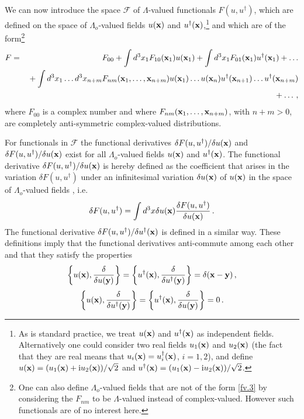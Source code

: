 \documentclass[12pt]{article}
\def\ii{\textrm i}
\begin{document}
We can now introduce the space ${\mathcal{F}}$ of $\Lambda$-valued functionals $F(u,u^\dagger)$, which are defined on the space of $\Lambda_o$-valued fields $u({\bf x})$ and $u^\dagger({\bf x})$,{\footnote{As is standard practice, we treat $u({\bf x})$ and $u^\dagger({\bf x})$ as independent fields. Alternatively one could consider two real fields $u_1({\bf x})$ and $u_2({\bf x})$ (the fact that they are real means that $u_i({\bf x})=u^\dagger_i({\bf x})$, $i=1,2$), and define $u({\bf x})=(u_1({\bf x}) + \ii u_2({\bf x}))/\sqrt{2}$ and $u^\dagger({\bf x})=(u_1({\bf x}) - \ii u_2({\bf x}))/\sqrt{2}$.}} and which are of the form{\footnote{One can also define $\Lambda_o$-valued fields that are not of the form \eqref{fv.3} by considering the $F_{nm}$ to be $\Lambda$-valued instead of complex-valued. However such functionals are of no interest here.}}
\begin{eqnarray}
F &=& F_{00} + \int d^3 x_1 F_{10} ({\bf x}_1) u({\bf x}_1) +  \int d^3 x_1 F_{01} ({\bf x}_1) u^\dagger({\bf x}_1) + \dots \nonumber\\
&& \mbox{} + \int d^3 x_1 \dots d^3 x_{n+m} F_{nm} ({\bf x}_1,\dots,{\bf x}_{n+m})  u({\bf x}_1) \dots u({\bf x}_n)  u^\dagger({\bf x}_{n+1}) \dots  u^\dagger({\bf x}_{n+m}) \nonumber\\
&&\mbox{}  +\dots \,,
\label{fv.3}
\end{eqnarray}
where $F_{00}$ is a complex number and where $F_{nm}({\bf x}_1,\dots,{\bf x}_{n+m})$, with $n+m>0$, are completely anti-symmetric complex-valued distributions. 

For functionals in ${\mathcal{F}}$ the functional derivatives ${\delta F(u,u^\dagger)}/{\delta u({\bf x})}$ and ${\delta F(u,u^\dagger)}/{\delta u({\bf x})}$ exist for all $\Lambda_o$-valued fields $u({\bf x})$ and $u^\dagger({\bf x})$. The functional derivative ${\delta F(u,u^\dagger)}/{\delta u({\bf x})}$ is hereby defined as the coefficient that arises in the variation $\delta F(u,u^\dagger)$ under an infinitesimal variation $\delta u({\bf x})$ of $u({\bf x})$ in the space of $\Lambda_o$-valued fields \cite{dewitt92}, i.e.
\begin{equation}
\delta F(u,u^\dagger) = \int d^3x \delta u({\bf x}) \frac{\delta F(u,u^\dagger)}{\delta u({\bf x})} \,.
\label{fv.4}
\end{equation}
The functional derivative ${\delta F(u,u^\dagger)}/{\delta u^\dagger({\bf x})}$ is defined in a similar way. These definitions imply that the functional derivatives anti-commute among each other and that they satisfy the properties
\begin{equation}
\left\{u({\bf x}),\frac{\delta}{\delta u({\bf y})}\right\} = \left\{u^\dagger({\bf x}),\frac{\delta}{\delta u^\dagger({\bf y})}\right\} = \delta({\bf x}-{\bf y})\,,
\label{fv.5}
\end{equation}
\begin{equation}
 \left\{u({\bf x}),\frac{\delta}{\delta u^\dagger({\bf y})}\right\} = \left\{u^\dagger({\bf x}),\frac{\delta}{\delta u({\bf y})}\right\} = 0 \,.
\label{fv.6}
\end{equation}
\end{document}
